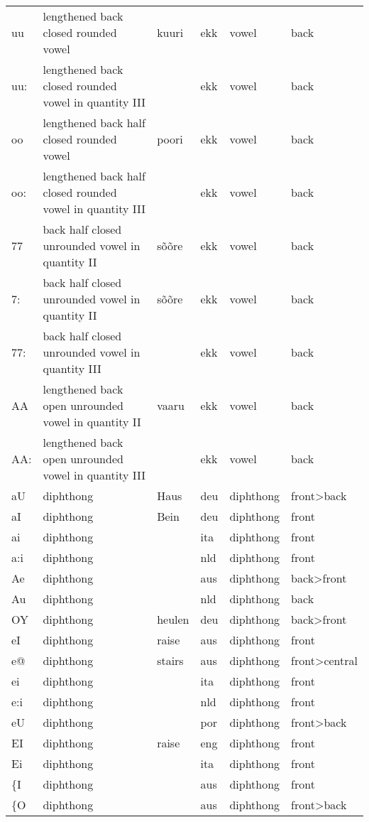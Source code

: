 {\begin{longtable}{l|p{.3\linewidth}|p{.15\linewidth}|l|p{.15\linewidth}|l}
	uu	& lengthened back closed rounded vowel	& kuuri	& ekk	& vowel	& back	\\
	uu:	& lengthened back closed rounded vowel in quantity III	& 	& ekk	& vowel	& back	\\
	oo	& lengthened back half closed rounded vowel	& poori	& ekk	& vowel	& back	\\
	oo:	& lengthened back half closed rounded vowel in quantity III	& 	& ekk	& vowel	& back	\\
	77	& back half closed unrounded vowel in quantity II	& sõõre	& ekk	& vowel	& back	\\
	7:	& back half closed unrounded vowel in quantity II	& sõõre	& ekk	& vowel	& back	\\
	77:	& back half closed unrounded vowel in quantity III	& 	& ekk	& vowel	& back	\\
	AA	& lengthened back open unrounded vowel in quantity II	& vaaru	& ekk	& vowel	& back	\\
	AA:	& lengthened back open unrounded vowel in quantity III	& 	& ekk	& vowel	& back	\\
	aU	& diphthong	& Haus	& deu	& diphthong	& front\textgreater back	\\
	aI	& diphthong	& Bein	& deu	& diphthong	& front	\\
	ai	& diphthong	& 	& ita	& diphthong	& front	\\
	a:i	& diphthong	& 	& nld	& diphthong	& front	\\
	Ae	& diphthong	& 	& aus	& diphthong	& back\textgreater front	\\
	Au	& diphthong	& 	& nld	& diphthong	& back	\\
	OY	& diphthong	& heulen	& deu	& diphthong	& back\textgreater front	\\
	eI	& diphthong	& raise	& aus	& diphthong	& front	\\
	e@	& diphthong	& stairs	& aus	& diphthong	& front\textgreater central	\\
	ei	& diphthong	& 	& ita	& diphthong	& front	\\
	e:i	& diphthong	& 	& nld	& diphthong	& front	\\
	eU	& diphthong	& 	& por	& diphthong	& front\textgreater back	\\
	EI	& diphthong	& raise	& eng	& diphthong	& front	\\
	Ei	& diphthong	& 	& ita	& diphthong	& front	\\
	\{I	& diphthong	& 	& aus	& diphthong	& front	\\
	\{O	& diphthong	& 	& aus	& diphthong	& front\textgreater back	\\

\end{longtable}}
